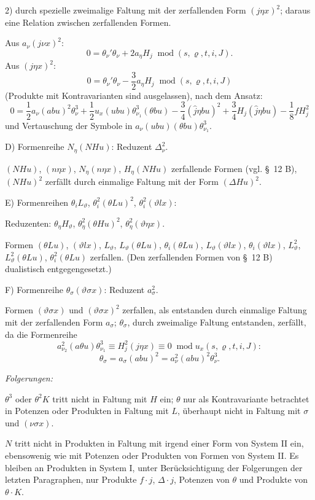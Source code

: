 \documentclass[11pt]{article}
\newcommand{\A}{\Delta}
\newcommand{\R}{\varrho}
\newcommand{\modu}[1]{\;\operatorname{mod} #1}
\providecommand{\modu}[1]{\;\operatorname{mod} #1}
\begin{document}
2) durch spezielle zweimalige Faltung mit der zerfallenden Form $(j\eta x)^2$; daraus eine Relation zwischen zerfallenden Formen.

Aus $a_\nu(j\nu x)^2$:
\[
0=\theta_\nu'\theta_\nu+2a_\eta H_j\modu{(s,\R,t,i,J)}.
\]
Aus $(j\eta x)^2$:
\[
0=\theta_\nu'\theta_\nu-\frac32a_\eta H_j\modu{(s,\R,t,i,J)}
\]
(Produkte mit Kontravarianten sind ausgelassen), nach dem Ansatz:
\[
0=\frac12a_\nu(abu)^2\theta_\nu^3
+\frac12u_x(ubu)\theta_{\nu_1}^3(\theta bu)
-\frac34(\widehat{j}\eta bu)^2+\frac34H_j(\widehat{j}\eta bu)
-\frac18fH_j^2
\]
und Vertauschung der Symbole in $a_\nu(ubu)(\theta bu)\theta_{\nu_1}^3$.

\noindent D) Formenreihe $N_\eta(NHu)$: Reduzent $\A_\nu^2$.

$(NHu)$, $(n\eta x)$, $N_\eta(n\eta x)$, $H_\eta(NHu)$ zerfallende Formen (vgl. \S\ 12 B), $(NHu)^2$ zerfällt durch einmalige Faltung mit der Form $(\A Hu)^2$.

\noindent E) Formenreihen $\theta_iL_\vartheta$, $\theta_i^2(\theta Lu)^2$, $\theta_i^2(\vartheta lx)$:

Reduzenten: $\theta_\eta H_\vartheta$, $\theta_\eta^2(\theta Hu)^2$, $\theta_\eta^2(\vartheta\eta x)$.

Formen $(\theta Lu)$, $(\vartheta lx)$, $L_\vartheta$, $L_\vartheta(\theta Lu)$, $\theta_i(\theta Lu)$, $L_\vartheta(\vartheta lx)$, $\theta_i(\vartheta lx)$, $L_\vartheta^2$, $L_\vartheta^2(\theta Lu)$, $\theta_i^2(\theta Lu)$ zerfallen. (Den zerfallenden Formen von \S\ 12 B) dualistisch entgegengesetzt.)

\noindent F) Formenreihe $\theta_\sigma(\vartheta\sigma x)$: Reduzent $a_\sigma^2$.

Formen $(\vartheta\sigma x)$ und $(\vartheta\sigma x)^2$ zerfallen, als entstanden durch einmalige Faltung mit der zerfallenden Form $a_\sigma$; $\theta_\sigma$, durch zweimalige Faltung entstanden, zerfällt, da die Formenreihe
\[
a_{\nu_2}^2(a\theta u)\theta_{\nu_1}^3\equiv H_j^2(j\eta x)\equiv0\modu{u_x(s,\R,t,i,J)}:
\]
\[
\theta_\sigma=a_\sigma(abu)^2=a_\nu^2(abu)^2\theta_\nu^3.
\]

\noindent\emph{Folgerungen:}

$\theta^3$ oder $\theta^2K$ tritt nicht in Faltung mit $H$ ein; $\theta$ nur als Kontravariante betrachtet in Potenzen oder Produkten in Faltung mit $L$, überhaupt nicht in Faltung mit $\sigma$ und $(\nu\sigma x)$.

$N$ tritt nicht in Produkten in Faltung mit irgend einer Form von System II ein, ebensowenig wie mit Potenzen oder Produkten von Formen von System II. Es bleiben an Produkten in System I, unter Berücksichtigung der Folgerungen der letzten Paragraphen, nur Produkte $f\cdot j$, $\A\cdot j$, Potenzen von $\theta$ und Produkte von $\theta\cdot K$.
\end{document}
